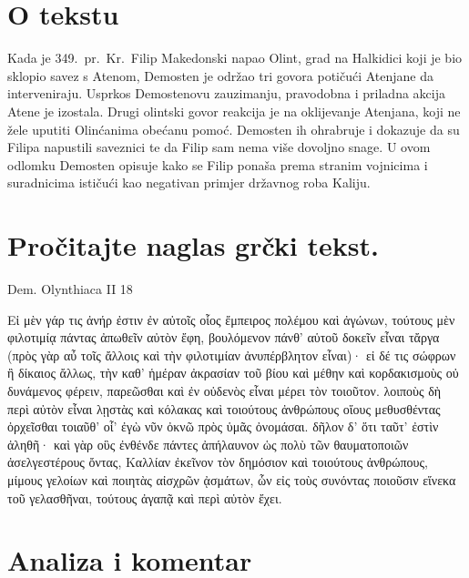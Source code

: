 \section*{O tekstu}

Kada je 349.\ pr.~Kr.\ Filip Makedonski napao Olint, grad na Halkidici koji je bio sklopio savez s Atenom, Demosten je održao tri govora potičući Atenjane da interveniraju. Usprkos Demostenovu zauzimanju, pravodobna i priladna akcija Atene je izostala. Drugi olintski govor reakcija je na oklijevanje Atenjana, koji ne žele uputiti Olinćanima obećanu pomoć. Demosten ih ohrabruje i dokazuje da su Filipa napustili saveznici te da Filip sam nema više dovoljno snage. U ovom odlomku Demosten opisuje kako se Filip ponaša prema stranim vojnicima i suradnicima ističući kao negativan primjer državnog roba Kaliju.


\section*{Pročitajte naglas grčki tekst.}
Dem. Olynthiaca II 18

\medskip

{\large
\begin{greek}
\noindent Εἰ μὲν γάρ τις ἀνήρ ἐστιν ἐν αὐτοῖς οἷος ἔμπειρος πολέμου καὶ ἀγώνων, τούτους μὲν φιλοτιμίᾳ πάντας ἀπωθεῖν αὐτὸν ἔφη, βουλόμενον πάνθ' αὑτοῦ δοκεῖν εἶναι τἄργα (πρὸς γὰρ αὖ τοῖς ἄλλοις καὶ  τὴν φιλοτιμίαν ἀνυπέρβλητον εἶναι)· εἰ δέ τις σώφρων ἢ δίκαιος ἄλλως, τὴν καθ' ἡμέραν ἀκρασίαν τοῦ βίου καὶ μέθην καὶ κορδακισμοὺς οὐ δυνάμενος φέρειν, παρεῶσθαι καὶ ἐν οὐδενὸς εἶναι μέρει τὸν τοιοῦτον. λοιποὺς δὴ περὶ αὐτὸν εἶναι λῃστὰς καὶ κόλακας καὶ τοιούτους ἀνθρώπους οἵους μεθυσθέντας ὀρχεῖσθαι τοιαῦθ' οἷ' ἐγὼ νῦν ὀκνῶ πρὸς ὑμᾶς ὀνομάσαι. δῆλον δ' ὅτι ταῦτ' ἐστὶν ἀληθῆ· καὶ γὰρ οὓς ἐνθένδε πάντες ἀπήλαυνον ὡς πολὺ τῶν θαυματοποιῶν ἀσελγεστέρους ὄντας, Καλλίαν ἐκεῖνον τὸν δημόσιον καὶ τοιούτους ἀνθρώπους, μίμους γελοίων καὶ ποιητὰς αἰσχρῶν ᾀσμάτων, ὧν εἰς τοὺς συνόντας ποιοῦσιν εἵνεκα τοῦ γελασθῆναι, τούτους ἀγαπᾷ καὶ περὶ αὑτὸν ἔχει.

\end{greek}

}

\section*{Analiza i komentar}


